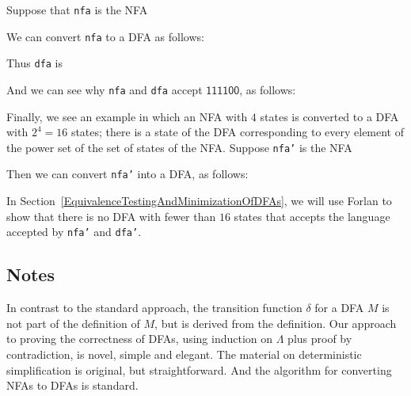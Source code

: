 Suppose that \texttt{nfa} is the NFA
\begin{center}

\end{center}
We can convert \texttt{nfa} to a DFA as follows:

Thus \texttt{dfa} is
\begin{center}

\end{center}
And we can see why \texttt{nfa} and \texttt{dfa} accept
$\mathsf{111100}$, as follows:


Finally, we see an example in which an NFA with $4$ states
is converted to a DFA with $2^4=16$ states; there is a state of the
DFA corresponding to every element of the power set of
the set of states of the NFA.  Suppose \texttt{nfa'} is
the NFA
\begin{center}

\end{center}
Then we can convert \texttt{nfa'} into a DFA, as follows:

In Section~\ref{EquivalenceTestingAndMinimizationOfDFAs},
we will use Forlan to show that there is no
DFA with fewer than $16$ states that accepts the language accepted
%
by \texttt{nfa'} and \texttt{dfa'}.

\subsection{Notes}

In contrast to the standard approach, the transition function $\delta$
for a DFA $M$ is not part of the definition of $M$, but is derived from
the definition.  Our approach to proving the correctness of DFAs,
using induction on $\Lambda$ plus proof by contradiction, is novel,
simple and elegant.  The material on deterministic simplification is
original, but straightforward.  And the algorithm for converting NFAs
to DFAs is standard.

